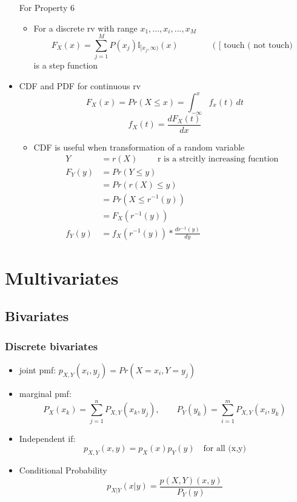 \documentclass[12pt]{article}
\begin{document}
\begin{itemize}
\begin{enumerate}
\end{enumerate}
For Property 6
\begin{itemize}
\item For a discrete rv with range ${x_1,...,x_i,...,x_M}$
$$F_X(x) = \sum_{j=1}^M P(x_j) \mathbb{I}_{[x_j, \infty)}(x)  \qquad \qquad \textrm{( [ touch ( not touch)} $$  is a step function
\end{itemize}
\item CDF and PDF for continuous rv
$$F_X(x) = Pr(X \le x) = \int_{-\infty}^x f_x(t) \, dt$$
$$f_X(t) = \frac{dF_X(t)}{dx}$$
\begin{itemize}
\item CDF is useful when transformation of a random variable 
\begin{align*}
Y &= r(X) \quad \quad \textrm{   r is a strcitly increasing fucntion} \\
F_Y(y) &= Pr(Y \le y)\\
&= Pr(r(X) \le y)\\
&= Pr(X \le r^{-1}(y)) \\
&= F_X(r^{-1}(y)) \\
f_Y(y) &= f_X(r^{-1}(y)) * \frac{dr^{-1}(y)}{dy}
\end{align*}
\end{itemize}
\end{itemize}

\section{Multivariates}
\subsection{Bivariates}
\subsubsection{Discrete bivariates}
\begin{itemize}
\item joint pmf: $p_{X,Y}(x_i,y_j) = Pr(X=x_i, Y=y_j)$
\item marginal pmf: 
$$ P_X(x_k) = \sum_{j=1}^n P_{X,Y}(x_k,y_j), \qquad  P_Y(y_k) = \sum_{i=1}^m P_{X,Y}(x_i,y_k) $$ 
\item Independent if:
$$p_{X,Y}(x,y) = p_X(x)p_Y(y)\quad \textrm{for all (x,y)}$$ 
\item Conditional Probability 
$$p_{X|Y}(x|y)=\frac{p(X,Y)(x,y)}{P_Y(y)}$$
\end{itemize}
\end{document}
